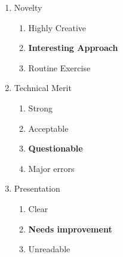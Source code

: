 \documentclass{article}
\begin{document}
\begin{enumerate}
 \item Novelty
 \begin{enumerate}[I]
  \item Highly Creative
  \item \textbf{Interesting Approach}
  \item Routine Exercise
 \end{enumerate} 
 
 \item Technical Merit
 \begin{enumerate}[I]
  \item Strong
  \item Acceptable
  \item \textbf{Questionable}
  \item Major errors
 \end{enumerate} 
 
 \item Presentation
 \begin{enumerate}[I]
  \item Clear
  \item \textbf{Needs improvement}
  \item Unreadable
 \end{enumerate}
 

\end{enumerate}
\end{document}
